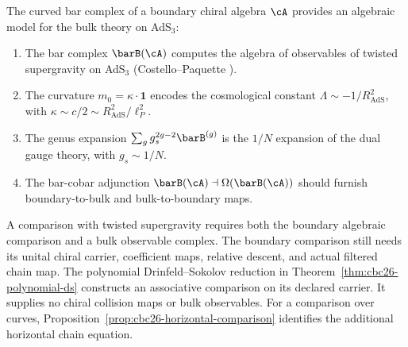 \begin{conjecture}\label{conj:ads-cft-bar}
The curved bar complex of a boundary chiral algebra $\cA$ provides
an algebraic model for the bulk theory on AdS$_3$:
\begin{enumerate}[label=\textup{(\roman*)}]
\item The bar complex $\barB(\cA)$ computes the algebra of
  observables of twisted supergravity on AdS$_3$
  \textup{(}Costello--Paquette \cite{CP2020}\textup{)}.
\item The curvature $m_0 = \kappa \cdot \mathbf{1}$ encodes
  the cosmological constant $\Lambda \sim -1/R_{\mathrm{AdS}}^2$,
  with $\kappa \sim c/2 \sim R_{\mathrm{AdS}}^2/\ell_P^2$.
\item The genus expansion $\sum_g g_s^{2g-2} \barB^{(g)}$
  is the $1/N$ expansion of the dual gauge theory, with
  $g_s \sim 1/N$.
\item The bar-cobar adjunction
  $\barB(\cA) \dashv \Omega(\barB(\cA))$
  should furnish boundary-to-bulk and bulk-to-boundary maps.
\end{enumerate}
\end{conjecture}

\begin{remark}[Scope]\label{rem:ads-scope}
A comparison with twisted supergravity requires both the boundary algebraic comparison and a bulk observable complex.
The boundary comparison still needs its unital chiral carrier, coefficient maps, relative descent, and actual filtered chain map.
The polynomial Drinfeld--Sokolov reduction in Theorem~\ref{thm:cbc26-polynomial-ds} constructs an associative comparison on its declared carrier.
It supplies no chiral collision maps or bulk observables.
For a comparison over curves, Proposition~\ref{prop:cbc26-horizontal-comparison} identifies the additional horizontal chain equation.
\end{remark}

